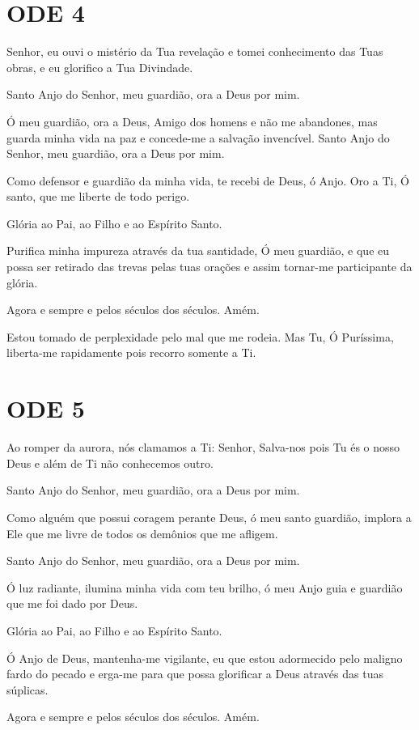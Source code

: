 \documentclass{subfiles}
\begin{document}
\section*{ODE 4}

\eirmos{}Senhor, eu ouvi o mistério da Tua revelação e tomei conhecimento das
Tuas obras, e eu glorifico a Tua Divindade.

Santo Anjo do Senhor, meu guardião, ora a Deus por mim.

Ó meu guardião, ora a Deus, Amigo dos homens e não me abandones,
mas guarda minha vida na paz e concede-me a salvação invencível.
Santo Anjo do Senhor, meu guardião, ora a Deus por mim.

Como defensor e guardião da minha vida, te recebi de Deus, ó Anjo.
Oro a Ti, Ó santo, que me liberte de todo perigo.

Glória ao Pai, ao Filho e ao Espírito Santo.

Purifica minha impureza através da tua santidade, Ó meu guardião, e
que eu possa ser retirado das trevas pelas tuas orações e assim tornar-me
participante da glória.

Agora e sempre e pelos séculos dos séculos. Amém.

Estou tomado de perplexidade pelo mal que me rodeia. Mas Tu, Ó
Puríssima, liberta-me rapidamente pois recorro somente a Ti.

\section*{ODE 5}

\eirmos{}Ao romper da aurora, nós clamamos a Ti: Senhor, Salva-nos pois Tu és
o nosso Deus e além de Ti não conhecemos outro.

Santo Anjo do Senhor, meu guardião, ora a Deus por mim.

Como alguém que possui coragem perante Deus, ó meu santo
guardião, implora a Ele que me livre de todos os demônios que me afligem.

Santo Anjo do Senhor, meu guardião, ora a Deus por mim.

Ó luz radiante, ilumina minha vida com teu brilho, ó meu Anjo guia e
guardião que me foi dado por Deus.

Glória ao Pai, ao Filho e ao Espírito Santo.

Ó Anjo de Deus, mantenha-me vigilante, eu que estou adormecido
pelo maligno fardo do pecado e erga-me para que possa glorificar a Deus
através das tuas súplicas.

Agora e sempre e pelos séculos dos séculos. Amém.
\end{document}
